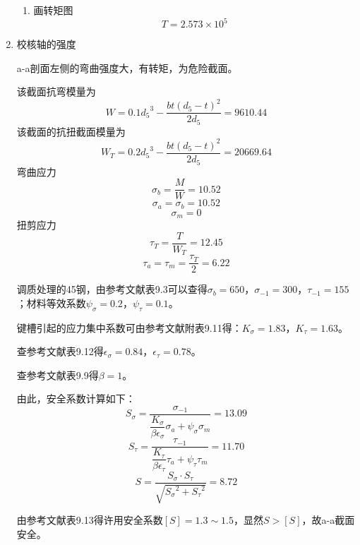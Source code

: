 \begin{enumerate}[A]
\begin{enumerate}[a]
		\item 画转矩图$$T=2.573\times 10^5$$
	\end{enumerate}
	\item 校核轴的强度
	\par a-a剖面左侧的弯曲强度大，有转矩，为危险截面。
	\par 该截面抗弯模量为
	$$W=0.1{d_5}^3-\dfrac{bt\left(d_5-t\right)^2}{2d_5}=9610.44$$
	该截面的抗扭截面模量为
	$$W_T=0.2{d_5}^3-\dfrac{bt\left(d_5-t\right)^2}{2d_5}=20669.64$$
	弯曲应力$$\sigma_b=\dfrac{M}{W}=10.52$$
	$$\sigma_a=\sigma_b=10.52$$
	$$\sigma_m=0$$
	扭剪应力
	$$\tau_T=\dfrac{T}{W_T}=12.45$$
	$$\tau_a=\tau_m=\dfrac{\tau_T}{2}=6.22$$
	\par 调质处理的45钢，由参考文献\cite{2}表9.3可以查得$\sigma_b=650$，$\sigma_{-1}=300$，$\tau_{-1}=155$；材料等效系数$\psi_\sigma=0.2$，$\psi_\tau=0.1$。
	\par 键槽引起的应力集中系数可由参考文献\cite{2}附表9.11得：$K_\sigma=1.83$，$K_\tau=1.63$。
	\par 查参考文献\cite{2}表9.12得$\epsilon_\sigma=0.84$，$\epsilon_\tau=0.78$。
	\par 查参考文献\cite{2}表9.9得$\beta=1$。
	\par 由此，安全系数计算如下：
	$$S_\sigma=\dfrac{\sigma_{-1}}{\dfrac{K_\sigma}{\beta \epsilon_\sigma}\sigma_a+\psi_\sigma \sigma_m}=13.09$$
	$$S_\tau=\dfrac{\tau_{-1}}{\dfrac{K_\tau}{\beta \epsilon_\tau}\tau_a+\psi_\tau \tau_m}=11.70$$
	$$S=\dfrac{S_\sigma\cdot S_\tau}{\sqrt{{S_\sigma}^2+{S_\tau}^2}}=8.72$$
	\par 由参考文献\cite{2}表9.13得许用安全系数$\left[S\right]=1.3\sim 1.5$，显然$S>\left[S\right]$，故a-a截面安全。
	

\end{enumerate}
